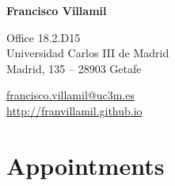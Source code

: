 \documentclass[a4paper, 12pt]{article}
\begin{document}

\begin{center}
{\bfseries\Large Francisco Villamil}
\end{center}

\vspace{0pt}

\noindent
\begin{minipage}[t]{0.47\textwidth}\small
\flushright
	Office 18.2.D15\\
	Universidad Carlos III de Madrid\\
	Madrid, 135 -- 28903 Getafe\\
\end{minipage}\hfill
\begin{minipage}[t]{0.47\textwidth}\small
	\vfill
	 \hspace{5pt} \href{mailto:francisco.villamil@uc3m.es}{francisco.villamil@uc3m.es}\\
	 \hspace{5pt} \href{http://franvillamil.github.io}{http://franvillamil.github.io}\\
\end{minipage}


\vspace{-10pt}
\section*{Appointments}
\end{document}
